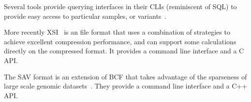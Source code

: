 \documentclass[a4paper,num-refs]{oup-contemporary}
\begin{document}
Several tools provide querying interfaces in their CLIs
(reminiscent of SQL) to provide easy access to particular samples, or
variants~\cite{li2016bgt,layer2016efficient}.

More recently XSI~\citep{wertenbroek2022xsi} is an file format that
uses a combination of strategies to achieve excellent compression
performance, and can support some calculations directly on the
compressed format. It provides a command line interface and a
C API.

The SAV format is an extension of BCF that takes advantage
of the sparseness of large scale genomic datasets~\citep{lefaive2021sparse}.
They provide a command line interface and a C++ API.


\end{document}
